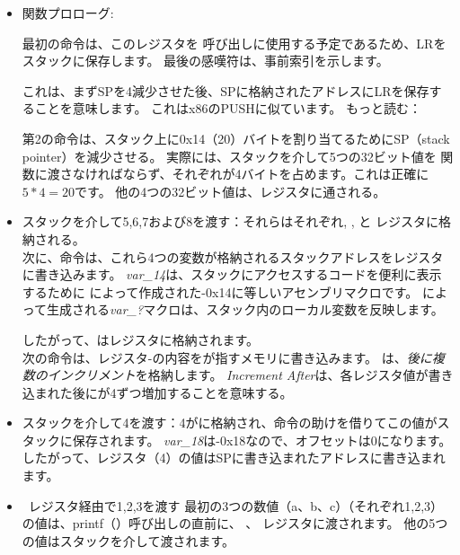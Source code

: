 \begin{itemize}
\item 関数プロローグ:

最初の命令は、このレジスタを \printf 呼び出しに使用する予定であるため、\ac{LR}をスタックに保存します。 
最後の感嘆符は、事前索引を示します。

これは、まず\ac{SP}を4減少させた後、\ac{SP}に格納されたアドレスに\ac{LR}を保存することを意味します。
これはx86のPUSHに似ています。 
もっと読む：

第2の命令は、スタック上に0x14（20）バイトを割り当てるために\ac{SP}（\gls{stack pointer}）を減少させる。 
実際には、スタックを介して5つの32ビット値を \printf 関数に渡さなければならず、それぞれが4バイトを占めます。これは正確に$5*4=20$です。
他の4つの32ビット値は、レジスタに通される。

\item スタックを介して5,6,7および8を渡す：それらはそれぞれ, ,  と レジスタに格納される。\\
次に、命令は、これら4つの変数が格納されるスタックアドレスをレジスタに書き込みます。 
\emph{var\_14}は、スタックにアクセスするコードを便利に表示するために \IDA によって作成された-0x14に等しいアセンブリマクロです。 
\IDA によって生成される\emph{var\_?}マクロは、スタック内のローカル変数を反映します。

したがって、はレジスタに格納されます。\\
次の命令は、レジスタ-の内容をが指すメモリに書き込みます。 
は、\emph{後に複数のインクリメント}を格納します。 
\emph{Increment After}は、各レジスタ値が書き込まれた後にが4ずつ増加することを意味する。

\item スタックを介して4を渡す：4がに格納され、命令の助けを借りてこの値がスタックに保存されます。
\emph{var\_18}は-0x18なので、オフセットは0になります。したがって、レジスタ（4）の値は\ac{SP}に書き込まれたアドレスに書き込まれます。

\item レジスタ経由で1,2,3を渡す
最初の3つの数値（a、b、c）（それぞれ1,2,3）の値は、printf（）呼び出しの直前に、 、 レジスタに渡されます。
他の5つの値はスタックを介して渡されます。


\end{itemize}
